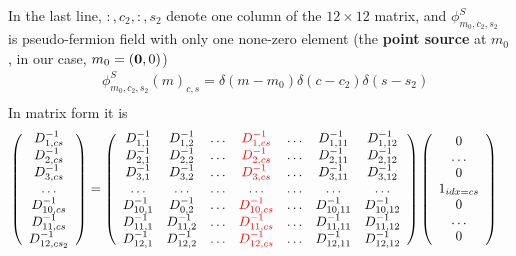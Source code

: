 In the last line, $:,c_2,:,s_2$ denote one column of the $12\times 12$ matrix, and $\phi ^{S}_{m_0,c_2,s_2}$ is pseudo-fermion field with only one none-zero element (the \textbf{point source} at $m_0$, in our case, $m_0=({\bf 0},0)$)
\begin{equation}
\begin{split}
&\phi ^{S}_{m_0,c_2,s_2}(m)_{c,s}=\delta (m-m_0)\delta (c-c_2)\delta (s-s_2)\\
\end{split}
\end{equation}
In matrix form it is
\begin{equation}
\begin{split}
&\left(\begin{array}{c} D^{-1}_{1,cs} \\ D^{-1}_{2,cs} \\ D^{-1}_{3,cs} \\ \ldots \\ D^{-1}_{10,cs}\\ D^{-1}_{11,cs} \\ D^{-1}_{12,cs_2}\end{array}\right)=\left(\begin{array}{ccccccc}
D^{-1}_{1,1} & D^{-1}_{1,2} & \ldots & \textcolor[rgb]{1,0,0}{D^{-1}_{1,cs}} & \ldots &  D^{-1}_{1,11} & D^{-1}_{1,12} \\
D^{-1}_{2,1} & D^{-1}_{2,2} & \ldots & \textcolor[rgb]{1,0,0}{D^{-1}_{2,cs}} & \ldots &  D^{-1}_{2,11} & D^{-1}_{2,12} \\
D^{-1}_{3,1} & D^{-1}_{3,2} & \ldots & \textcolor[rgb]{1,0,0}{D^{-1}_{3,cs}} & \ldots &  D^{-1}_{3,11} & D^{-1}_{3,12} \\
\ldots & \ldots & \ldots & \ldots & \ldots &  \ldots & \ldots \\
D^{-1}_{10,1} & D^{-1}_{0,2} & \ldots & \textcolor[rgb]{1,0,0}{D^{-1}_{10,cs}} & \ldots &  D^{-1}_{10,11} & D^{-1}_{10,12} \\
D^{-1}_{11,1} & D^{-1}_{11,2} & \ldots & \textcolor[rgb]{1,0,0}{D^{-1}_{11,cs}} & \ldots &  D^{-1}_{11,11} & D^{-1}_{11,12} \\
D^{-1}_{12,1} & D^{-1}_{12,2} & \ldots & \textcolor[rgb]{1,0,0}{D^{-1}_{12,cs}} & \ldots &  D^{-1}_{12,11} & D^{-1}_{12,12} \\
 \end{array}\right)\left(\begin{array}{c} 0\\ \ldots \\ 0 \\ 1 _{idx=cs}\\ 0 \\ \ldots \\ 0 \end{array}\right)
\end{split}
\label{eq.mesoncorrelator.matrix1}
\end{equation}

